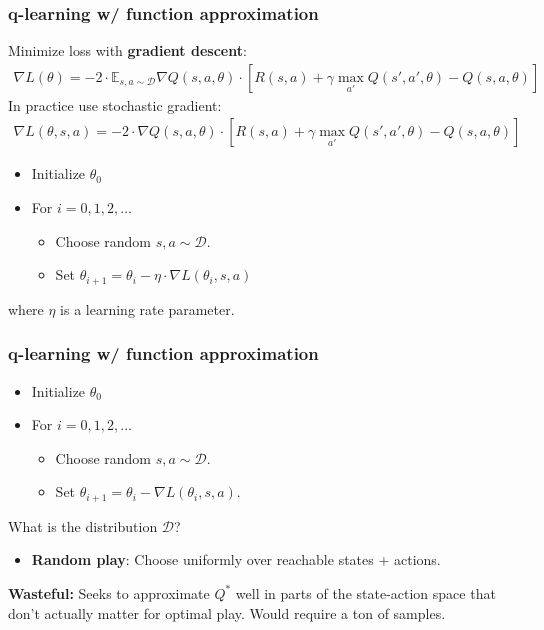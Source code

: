 \documentclass[handout,compress]{beamer}
\newcommand{\E}{\mathbb{E}}
\begin{document}
\begin{frame}
	\frametitle{q-learning w/ function approximation}
	\small
	Minimize loss with \textbf{gradient descent}:
	\begin{align*}
	\nabla L(\theta) = -2\cdot \E_{s,a \sim \mathcal{D}} \nabla Q(s,a,\theta)\cdot \left[R(s,a) + \gamma \max_{a'}Q(s',a', \theta) - Q(s,a,\theta) \right]
	\end{align*}
	In practice use stochastic gradient:
	\begin{align*}
	\nabla L(\theta,s,a) = -2\cdot \nabla Q(s,a,\theta) \cdot \left[R(s,a) + \gamma \max_{a'}Q(s',a', \theta) - Q(s,a,\theta)\right]
	\end{align*}
	\begin{itemize}
		\item Initialize $\theta_0$
		\item For $i=0,1,2,\ldots $
		\begin{itemize}
			\item {Choose random $s,a \sim \mathcal{D}$.}
			\item Set $\theta_{i+1} = \theta_i - \eta\cdot\nabla L(\theta_i,s,a)$
		\end{itemize}
	\end{itemize}
where $\eta$ is a learning rate parameter.
\end{frame}
\begin{frame}
	\frametitle{q-learning w/ function approximation}
	\small
	\begin{itemize}
		\item Initialize $\theta_0$
		\item For $i=0,1,2,\ldots $
		\begin{itemize}
			\item \alert{Choose random $s,a \sim \mathcal{D}$.}
			\item Set $\theta_{i+1} = \theta_i - \nabla L(\theta_i,s,a)$.
		\end{itemize}
	\end{itemize}
What is the distribution $\mathcal{D}$?

\begin{itemize}
	\item \textbf{Random play}: Choose uniformly over reachable states + actions.
\end{itemize}
\textbf{Wasteful:} Seeks to approximate $Q^*$ well in parts of the state-action space that don't actually matter for optimal play. Would require a ton of samples. 
\end{frame}
\end{document}

